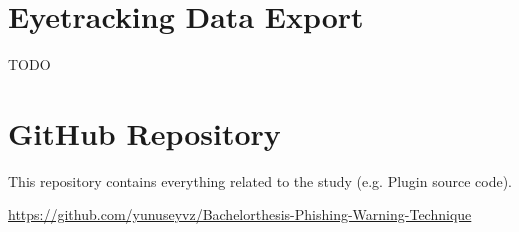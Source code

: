 \documentclass[
  a4paper,  %
  twoside,  %
  bibliography=totoc,
  headsepline,
  cleardoublepage=empty,
  parskip=half,
  draft=false
]{scrbook}
\begin{document}
\section{Eyetracking Data Export}
\label{eyetrackingdata}
TODO

\section{GitHub Repository}
\label{sec:github}
This repository contains everything related to the study (e.g. Plugin source code).\par
\href{https://github.com/yunuseyvz/Bachelorthesis-Phishing-Warning-Techniques}{https://github.com/yunuseyvz/Bachelorthesis-Phishing-Warning-Technique}



%

\pagestyle{empty}
\renewcommand*{\chapterpagestyle}{empty}
\Affirmation
\end{document}
